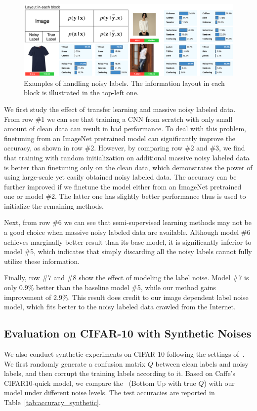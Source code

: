 \documentclass[10pt,twocolumn,letterpaper]{article}
\begin{document}
\begin{figure}
\begin{center}
\includegraphics[width=1.0\linewidth]{figure/model_output.pdf}
\caption{Examples of handling noisy labels. The information layout in each block is illustrated in the top-left one.}
\label{fig:model_output}
\end{center}
\end{figure}

We first study the effect of transfer learning and massive noisy labeled data. From row \#1 we can see that training a CNN from scratch with only small amount of clean data can result in bad performance. To deal with this problem, finetuning from an ImageNet pretrained model can significantly improve the accuracy, as shown in row \#2. However, by comparing row \#2 and \#3, we find that training with random initialization on additional massive noisy labeled data is better than finetuning only on the clean data, which demonstrates the power of using large-scale yet easily obtained noisy labeled data. The accuracy can be further improved if we finetune the model either from an ImageNet pretrained one or model \#2. The latter one has slightly better performance thus is used to initialize the remaining methods.

Next, from row \#6 we can see that semi-supervised learning methods may not be a good choice when massive noisy labeled data are available. Although model \#6 achieves marginally better result than its base model, it is significantly inferior to model \#5, which indicates that simply discarding all the noisy labels cannot fully utilize these information.

Finally, row \#7 and \#8 show the effect of modeling the label noise. Model \#7 is only $0.9\%$ better than the baseline model \#5, while our method gains improvement of $2.9\%$. This result does credit to our image dependent label noise model, which fits better to the noisy labeled data crawled from the Internet.

\subsection{Evaluation on CIFAR-10 with Synthetic Noises} %
\label{sub:evaluation_on_synthetic_dataset}
We also conduct synthetic experiments on CIFAR-10 following the settings of~\cite{sukhbaatar2014learning}. We first randomly generate a confusion matrix $Q$ between clean labels and noisy labels, and then corrupt the training labels according to it. Based on Caffe's CIFAR10-quick model, we compare the~\cite{sukhbaatar2014learning} (Bottom Up with true $Q$) with our model under different noise levels. The test accuracies are reported in Table~\ref{tab:accuracy_synthetic}.
\end{document}
